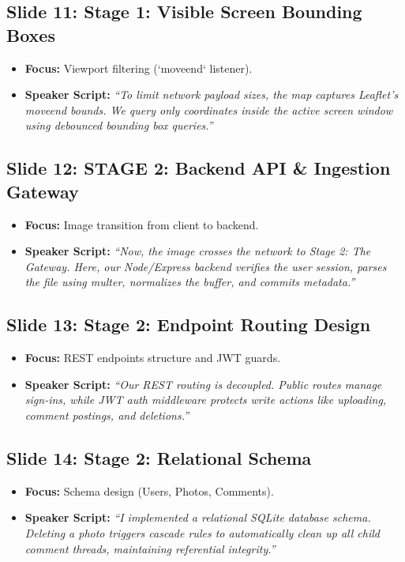\documentclass[11pt]{article}
\begin{document}
\subsection{Slide 11: Stage 1: Visible Screen Bounding Boxes}
\begin{itemize}
    \item \textbf{Focus:} Viewport filtering (`moveend` listener).
    \item \textbf{Speaker Script:} 
    \textit{``To limit network payload sizes, the map captures Leaflet's moveend bounds. We query only coordinates inside the active screen window using debounced bounding box queries.''}
\end{itemize}

\subsection{Slide 12: STAGE 2: Backend API \& Ingestion Gateway}
\begin{itemize}
    \item \textbf{Focus:} Image transition from client to backend.
    \item \textbf{Speaker Script:} 
    \textit{``Now, the image crosses the network to Stage 2: The Gateway. Here, our Node/Express backend verifies the user session, parses the file using multer, normalizes the buffer, and commits metadata.''}
\end{itemize}

\subsection{Slide 13: Stage 2: Endpoint Routing Design}
\begin{itemize}
    \item \textbf{Focus:} REST endpoints structure and JWT guards.
    \item \textbf{Speaker Script:} 
    \textit{``Our REST routing is decoupled. Public routes manage sign-ins, while JWT auth middleware protects write actions like uploading, comment postings, and deletions.''}
\end{itemize}

\subsection{Slide 14: Stage 2: Relational Schema}
\begin{itemize}
    \item \textbf{Focus:} Schema design (Users, Photos, Comments).
    \item \textbf{Speaker Script:} 
    \textit{``I implemented a relational SQLite database schema. Deleting a photo triggers cascade rules to automatically clean up all child comment threads, maintaining referential integrity.''}
\end{itemize}
\end{document}
